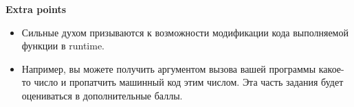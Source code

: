 \documentclass[../../lectures.tex]{subfiles}
\begin{document}
\textbf{Extra points}
\begin{itemize}
    \item Сильные духом призываются к возможности модификации кода выполняемой функции
          в runtime. 
    \item Например, вы можете получить аргументом вызова вашей программы
          какое-то число и пропатчить машинный код этим числом. Эта часть задания будет
          оцениваться в дополнительные баллы.
\end{itemize}
\end{document}
